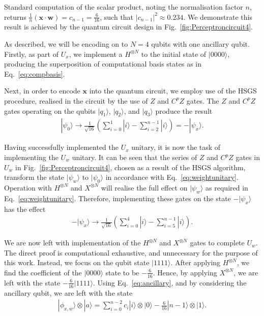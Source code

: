 \documentclass[twocolumn,superscriptaddress]{revtex4-1}
\begin{document}
Standard computation of the scalar product, noting the normalisation factor $n$, returns $\frac{1}{n} (\bm{x} \cdot \bm{w}) = c_{n-1} = \frac{6}{16}$, such that $|c_{n-1}|^2 \approx 0.234$. We demonstrate this result is achieved by the quantum circuit design in Fig.~\ref{fig:Perceptroncircuit4}.

As described, we will be encoding on to $N=4$ qubits with one ancillary qubit. Firstly, as part of $U_x$, we implement a $H^{\otimes N}$ to the initial state of $|0000 \rangle$, producing the superposition of computational basis states as in Eq.~\ref{eq:compbasis}.

Next, in order to encode $\bm{x}$ into the quantum circuit, we employ use of the HSGS procedure, realised in the circuit by the use of $Z$ and $C^p Z$ gates. The $Z$ and $C^pZ$ gates operating on the qubits $|q_1 \rangle$, $|q_2 \rangle$, and $|q_3 \rangle$ produce the result
\begin{equation} \label{eq:negativeinput}
\begin{split}
| \psi _ 0 \rangle \longrightarrow \frac{1}{\sqrt{16}} \left( \sum_{i=0}^{1} |i \rangle  - \sum_{i=2}^{n-1} |i \rangle \right) = -|\psi_{x} \rangle .
\end{split}
\end{equation}

Having successfully implemented the $U_x$ unitary, it is now the task of implementing the $U_w$ unitary. It can be seen that the series of $Z$ and $C^pZ$ gates in $U_w$ in Fig.~\ref{fig:Perceptroncircuit4}, chosen as a result of the HSGS algorithm, transform the state $| \psi_w \rangle$ to $|\psi_0 \rangle$ in accordance with Eq.~\ref{eq:weightunitary}. Operation with $H^{\otimes N}$ and $X^{\otimes N}$ will realise the full effect on $| \psi_w \rangle$ as required in Eq.~\ref{eq:weightunitary}. Therefore, implementing these gates on the state $- |\psi_x \rangle$ has the effect
\begin{equation} \label{eq:appendixweight}
\begin{split}
-|\psi_{x} \rangle \longrightarrow \frac{1}{\sqrt{16}} \left( \sum_{i=0}^{4} |i \rangle - \sum_{i=5}^{n-1} |i \rangle \right) .
\end{split}
\end{equation}

We are now left with implementation of the $H^{\otimes N}$ and $X ^{\otimes N}$ gates to complete $U_w$. The direct proof is computational exhaustive, and unnecessary for the purpose of this work. Instead, we focus on the qubit state $|1111 \rangle$. After applying $H^{\otimes N}$, we find the coefficient of the $|0000 \rangle$ state to be $-\frac{6}{16}$. Hence, by applying $X ^{\otimes N}$, we are left with the state $-\frac{6}{16} |1111 \rangle$. Using Eq.~\ref{eq:ancillary}, and by considering the ancillary qubit, we are left with the state
\begin{equation} \label{eq:finalstate}
\begin{split}
|\phi_{x,w} \rangle \otimes |a \rangle = \sum_{i=0}^{n-2} c_i |i \rangle \otimes {|0 \rangle} -\frac{6}{16} |n-1 \rangle \otimes {|1\rangle} .
\end{split}
\end{equation}
\end{document}
